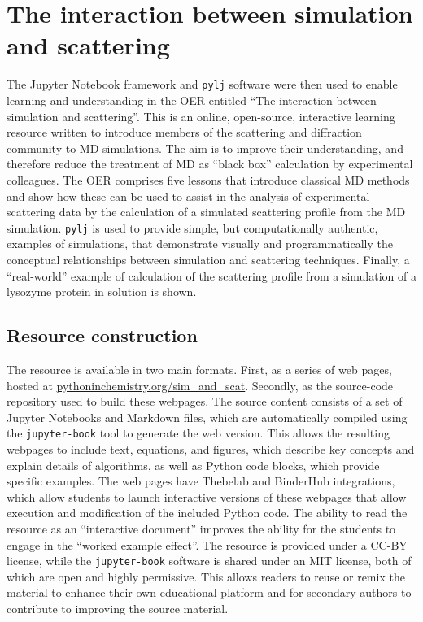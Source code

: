 \section{The interaction between simulation and scattering}
\label{sec:sim_and_scat}
The Jupyter Notebook framework and \texttt{pylj} software were then used to enable learning and understanding in the OER entitled ``The interaction between simulation and scattering''.
This is an online, open-source, interactive learning resource written to introduce members of the scattering and diffraction community to MD simulations.
The aim is to improve their understanding, and therefore reduce the treatment of MD as ``black box'' calculation by experimental colleagues.
The OER comprises five lessons that introduce classical MD methods and show how these can be used to assist in the analysis of experimental scattering data by the calculation of a simulated scattering profile from the MD simulation.
\texttt{pylj} is used to provide simple, but computationally authentic, examples of simulations, that demonstrate visually and programmatically the conceptual relationships between simulation and scattering techniques.
Finally, a ``real-world'' example of calculation of the scattering profile from a simulation of a lysozyme protein in solution is shown.

\subsection{Resource construction}
The resource is available in two main formats.
First, as a series of web pages, hosted at \href{https://pythoninchemistry.org/sim_and_scat}{pythoninchemistry.org/sim\_and\_scat}.
Secondly, as the source-code repository used to build these webpages.\autocite{mccluskey_pythoninchemistry/sim_and_scat_2019}
The source content consists of a set of Jupyter Notebooks and Markdown files, which are automatically compiled using the \texttt{jupyter-book} tool\autocite{lau_jupyter/jupyter-book_2019} to generate the web version.
This allows the resulting webpages to include text, equations, and figures, which describe key concepts and explain details of algorithms, as well as Python code blocks, which provide specific examples.
The web pages have Thebelab and BinderHub integrations,\autocite{ragan-kelley_minrk/thebelab_2019, ragan-kelley_jupyterhub/binderhub_2019, jupyter_binder_2018} which allow students to launch interactive versions of these webpages that allow execution and modification of the included Python code.
The ability to read the resource as an ``interactive document'' improves the ability for the students to engage in the ``worked example effect''.\autocite{tarmizi_guidance_1988}
The resource is provided under a CC-BY license,\autocite{creative_commons_creative_2019} while the \texttt{jupyter-book} software is shared under an MIT license,\autocite{open_source_mit_2019} both of which are open and highly permissive.
This allows readers to reuse or remix the material to enhance their own educational platform and for secondary authors to contribute to improving the source material.

